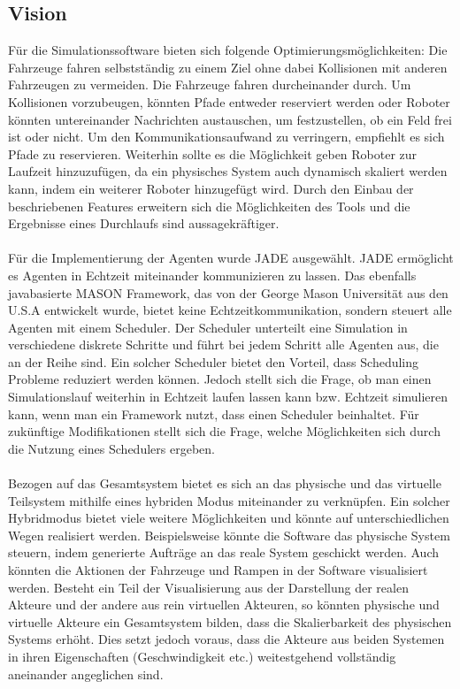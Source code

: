 \subsection{Vision}
Für die Simulationssoftware bieten sich folgende Optimierungsmöglichkeiten: Die Fahrzeuge fahren selbstständig zu einem Ziel ohne dabei Kollisionen mit anderen Fahrzeugen zu vermeiden. Die Fahrzeuge fahren durcheinander durch. Um Kollisionen vorzubeugen, könnten Pfade entweder reserviert werden oder Roboter könnten untereinander Nachrichten austauschen, um festzustellen, ob ein Feld frei ist oder nicht. Um den Kommunikationsaufwand zu verringern, empfiehlt es sich Pfade zu reservieren. Weiterhin sollte es die Möglichkeit geben Roboter zur Laufzeit hinzuzufügen, da ein physisches System auch dynamisch skaliert werden kann, indem ein weiterer Roboter hinzugefügt wird. Durch den Einbau der beschriebenen Features erweitern sich die Möglichkeiten des Tools und die Ergebnisse eines Durchlaufs sind aussagekräftiger.
\\\\
Für die Implementierung der Agenten wurde JADE ausgewählt. JADE ermöglicht es Agenten in Echtzeit miteinander kommunizieren zu lassen. Das ebenfalls javabasierte MASON Framework, das von der George Mason Universität aus den U.S.A entwickelt wurde, bietet keine Echtzeitkommunikation, sondern steuert alle Agenten mit einem Scheduler. Der Scheduler unterteilt eine Simulation in verschiedene diskrete Schritte und führt bei jedem Schritt alle Agenten aus, die an der Reihe sind. Ein solcher Scheduler bietet den Vorteil, dass Scheduling Probleme reduziert werden können. Jedoch stellt sich die Frage, ob man einen Simulationslauf weiterhin in Echtzeit laufen lassen kann bzw. Echtzeit simulieren kann, wenn man ein Framework nutzt, dass einen Scheduler beinhaltet. Für zukünftige Modifikationen stellt sich die Frage, welche Möglichkeiten sich durch die Nutzung eines Schedulers ergeben.
\\\\
Bezogen auf das Gesamtsystem bietet es sich an das physische und das virtuelle Teilsystem mithilfe eines hybriden Modus miteinander zu verknüpfen. Ein solcher Hybridmodus bietet viele weitere Möglichkeiten und könnte auf unterschiedlichen Wegen realisiert werden. Beispielsweise könnte die Software das physische System steuern, indem generierte Aufträge an das reale System geschickt werden. Auch könnten die Aktionen der Fahrzeuge und Rampen in der Software visualisiert werden. Besteht ein Teil der Visualisierung aus der Darstellung der realen Akteure und der andere aus rein virtuellen Akteuren, so könnten physische und virtuelle Akteure ein Gesamtsystem bilden, dass die Skalierbarkeit des physischen Systems erhöht. Dies setzt jedoch voraus, dass die Akteure aus beiden Systemen in ihren Eigenschaften (Geschwindigkeit etc.) weitestgehend vollständig aneinander angeglichen sind.




